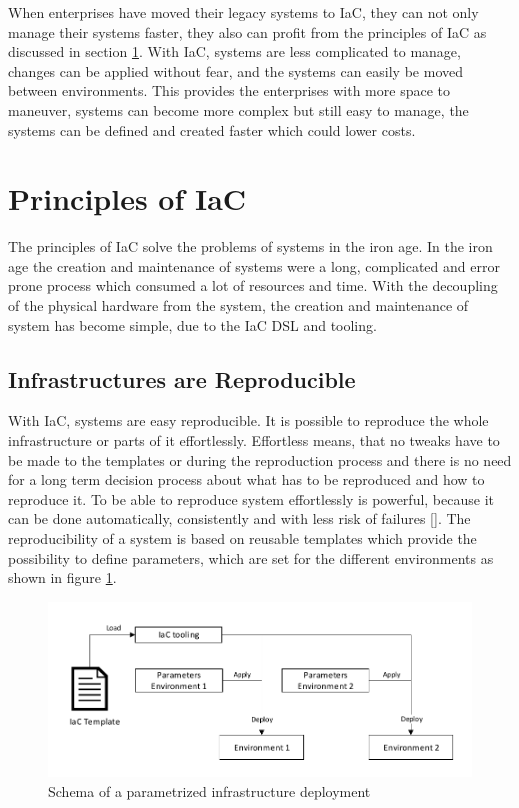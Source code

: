 When enterprises have moved their legacy systems to IaC, they can not only manage their systems faster, they also can profit from the principles of IaC as discussed in section \ref{sec:iac-principles}. With IaC, systems are less complicated to manage, changes can be applied without fear, and the systems can easily be moved between environments. This provides the enterprises with more space to maneuver, systems can become more complex but still easy to manage, the systems can be defined and created faster which could lower costs.    

\section{Principles of IaC}
\label{sec:iac-principles}
The principles of IaC solve the problems of systems in the iron age. In the iron age the creation and maintenance of systems were a long, complicated and error prone process which consumed a lot of resources and time. With the decoupling of the physical hardware from the system, the creation and maintenance of system has become simple, due to the IaC DSL and tooling. 

\subsection{Infrastructures are Reproducible}
\label{sec:iac-principles-reproducibility}
With IaC, systems are easy reproducible. It is possible to reproduce the whole infrastructure or parts of it effortlessly. Effortless means, that no tweaks have to be made to the templates or during the reproduction process and there is no need for a long term decision process about what has to be reproduced and how to reproduce it. To be able to reproduce system effortlessly is powerful, because it can be done automatically, consistently and with less risk of failures [\cite[p. 10]{Morris2016}]. The reproducibility of a system is based on reusable templates which provide the possibility to define parameters, which are set for the different environments as shown in figure \ref{fig:reproduce-infrastructure}.
\begin{figure}[htbp]
	\centering
	\includegraphics[scale=0.95]{images/reproduce-infrastructure.pdf}
	\caption{Schema of a parametrized infrastructure deployment}
	\label{fig:reproduce-infrastructure}
\end{figure} 

